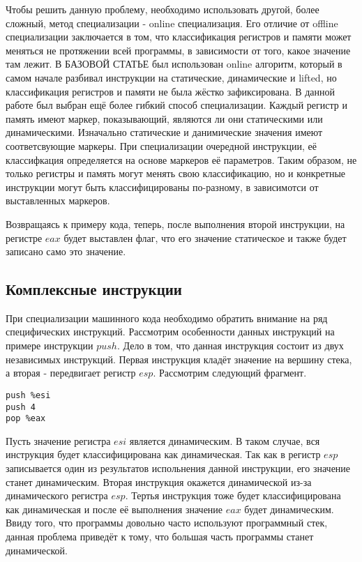 \documentclass{spbau-diploma}
\begin{document}
Чтобы решить данную проблему, необходимо использовать другой, более сложный, метод специализации - online специализация. Его отличие от offline специализации заключается в том, что классификация регистров и памяти может меняться не протяжении всей программы, в зависимости от того, какое значение там лежит. В {\LARGE БАЗОВОЙ СТАТЬЕ} был использован online алгоритм, который в самом начале разбивал инструкции на статические, динамические и lifted, но классификация регистров и памяти не была жёстко зафиксирована. В данной работе был выбран ещё более гибкий способ специализации. Каждый регистр и память имеют маркер, показывающий, являются ли они статическими или динамическими. Изначально статические и данимические значения имеют соответсвующие маркеры. При специализации очередной инструкции, её классифкация определяется на основе маркеров её параметров. Таким образом, не только регистры и память могут менять свою классификацию, но и конкретные инструкции могут быть классифицированы по-разному, в зависимотси от выставленных маркеров.

Возвращаясь к примеру кода, теперь, после выполнения второй инструкции, на регистре $eax$ будет выставлен флаг, что его значение статическое и также будет записано само это значение.

\subsection{ Комплексные инструкции}
При специализации машинного кода необходимо обратить внимание на ряд специфических инструкций. Рассмотрим особенности данных инструкций на примере инструкции $push$. Дело в том, что данная инструкция состоит из двух независимых инструкций. Первая инструкция кладёт значение на вершину стека, а вторая - передвигает регистр $esp$. Рассмотрим следующий фрагмент.
\begin{lstlisting}
push %esi
push 4
pop %eax
\end{lstlisting}
Пусть значение регистра $esi$ является динамическим. В таком случае, вся инструкция будет классифицирована как динамическая. Так как в регистр $esp$ записывается один из результатов испольнения данной инструкции, его значение станет динамическим. Вторая инструкция окажется динамической из-за динамического регистра $esp$. Тертья инструкция тоже будет классифицирована как  динамическая и после её выполнения значение $eax$ будет динамическим. Ввиду того, что программы довольно часто используют программный стек, данная проблема приведёт к тому, что большая часть программы станет динамической.
\end{document}
